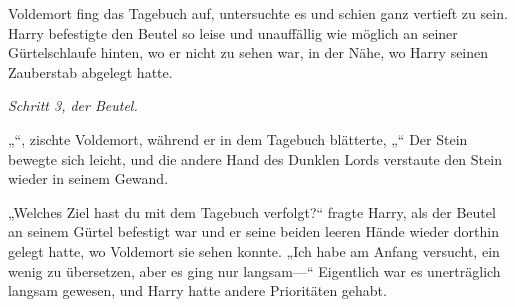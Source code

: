 Voldemort fing das Tagebuch auf, untersuchte es und schien ganz vertieft zu sein.
Harry befestigte den Beutel so leise und unauffällig wie möglich an seiner Gürtelschlaufe hinten, wo er nicht zu sehen war, in der Nähe, wo Harry seinen Zauberstab abgelegt hatte.

\emph{Schritt 3, der Beutel.}

„“, zischte Voldemort, während er in dem Tagebuch blätterte, „“
Der Stein bewegte sich leicht, und die andere Hand des Dunklen Lords verstaute den Stein wieder in seinem Gewand.

„Welches Ziel hast du mit dem Tagebuch verfolgt?“ fragte Harry, als der Beutel an seinem Gürtel befestigt war und er seine beiden leeren Hände wieder dorthin gelegt hatte, wo Voldemort sie sehen konnte.
„Ich habe am Anfang versucht, ein wenig zu übersetzen, aber es ging nur langsam—“
Eigentlich war es unerträglich langsam gewesen, und Harry hatte andere Prioritäten gehabt.

